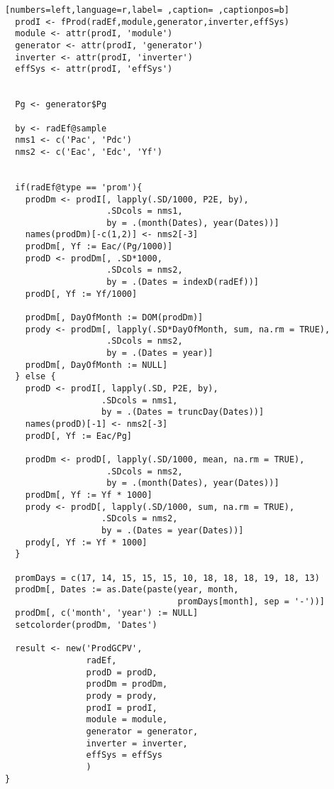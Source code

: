 \begin{lstlisting}[numbers=left,language=r,label= ,caption= ,captionpos=b]
  prodI <- fProd(radEf,module,generator,inverter,effSys)
  module <- attr(prodI, 'module')
  generator <- attr(prodI, 'generator')
  inverter <- attr(prodI, 'inverter')
  effSys <- attr(prodI, 'effSys')


  Pg <- generator$Pg 

  by <- radEf@sample
  nms1 <- c('Pac', 'Pdc')
  nms2 <- c('Eac', 'Edc', 'Yf')


  if(radEf@type == 'prom'){
    prodDm <- prodI[, lapply(.SD/1000, P2E, by),
                    .SDcols = nms1,
                    by = .(month(Dates), year(Dates))]
    names(prodDm)[-c(1,2)] <- nms2[-3]
    prodDm[, Yf := Eac/(Pg/1000)]
    prodD <- prodDm[, .SD*1000,
                    .SDcols = nms2,
                    by = .(Dates = indexD(radEf))]
    prodD[, Yf := Yf/1000]

    prodDm[, DayOfMonth := DOM(prodDm)]
    prody <- prodDm[, lapply(.SD*DayOfMonth, sum, na.rm = TRUE),
                    .SDcols = nms2,
                    by = .(Dates = year)]
    prodDm[, DayOfMonth := NULL]
  } else {
    prodD <- prodI[, lapply(.SD, P2E, by),
                   .SDcols = nms1,
                   by = .(Dates = truncDay(Dates))]
    names(prodD)[-1] <- nms2[-3]
    prodD[, Yf := Eac/Pg]

    prodDm <- prodD[, lapply(.SD/1000, mean, na.rm = TRUE),
                    .SDcols = nms2,
                    by = .(month(Dates), year(Dates))]
    prodDm[, Yf := Yf * 1000]
    prody <- prodD[, lapply(.SD/1000, sum, na.rm = TRUE),
                   .SDcols = nms2,
                   by = .(Dates = year(Dates))]
    prody[, Yf := Yf * 1000]
  }

  promDays = c(17, 14, 15, 15, 15, 10, 18, 18, 18, 19, 18, 13)
  prodDm[, Dates := as.Date(paste(year, month,
                                  promDays[month], sep = '-'))]
  prodDm[, c('month', 'year') := NULL]
  setcolorder(prodDm, 'Dates')

  result <- new('ProdGCPV',
                radEf,                  
                prodD = prodD,
                prodDm = prodDm,
                prody = prody,
                prodI = prodI,
                module = module,
                generator = generator,
                inverter = inverter,
                effSys = effSys
                )
}
\end{lstlisting}
